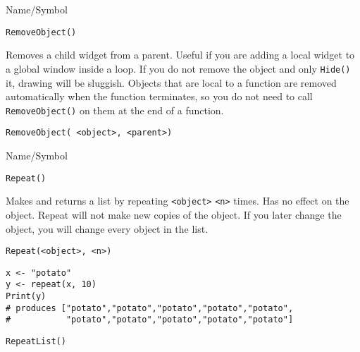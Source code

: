 \rl



\begin{desc}{Name/Symbol}
\item[Name/Symbol]	\verb+RemoveObject()+

\item[Description] Removes a child widget from a parent.  Useful if
  you are adding a local widget to a global window inside a loop.  If
  you do not remove the object and only \verb+Hide()+ it, drawing will
  be sluggish.  Objects that are local to a function are removed
  automatically when the function terminates, so you do not need to
  call \verb+RemoveObject()+ on them at the end of a function.

\item[Usage]
\begin{verbatim}
RemoveObject( <object>, <parent>)
\end{verbatim}

\item[Example]	

\item[See Also]	
\end{desc}

\rl


\begin{desc}{Name/Symbol}
\item[Name/Symbol] 	\verb+Repeat()+

\item[Description] 	Makes and returns a list by repeating \verb+<object>+ \verb+<n>+ times. 
		Has no effect on the object. Repeat will not make new copies 
		of the object. If you later change the object, 
		you will change every object in the list.

\item[Usage]       	
\begin{verbatim}
Repeat(<object>, <n>)
\end{verbatim}
	    	
\item[Example]     	
\begin{verbatim}
x <- "potato"
y <- repeat(x, 10)
Print(y)
# produces ["potato","potato","potato","potato","potato", 
#           "potato","potato","potato","potato","potato"]
\end{verbatim}
	     	     
\item[See Also]    	\verb+RepeatList()+
\end{desc}

